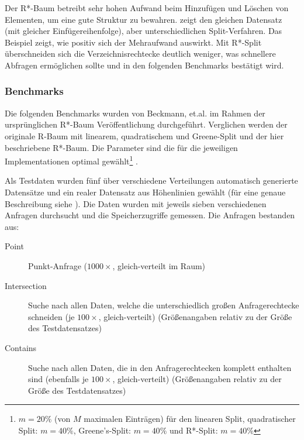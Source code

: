 \documentclass[runningheads,a4paper]{llncs}
\begin{document}
	Der R*-Baum betreibt sehr hohen Aufwand beim Hinzufügen und Löschen von Elementen, um eine gute Struktur zu bewahren.  zeigt den gleichen Datensatz (mit gleicher Einfügereihenfolge), aber unterschiedlichen Split-Verfahren. Das Beispiel zeigt, wie positiv sich der Mehraufwand auswirkt. Mit R*-Split überschneiden sich die Verzeichnisrechtecke deutlich weniger, was schnellere Abfragen ermöglichen sollte und in den folgenden Benchmarks bestätigt wird.

	\subsubsection{Benchmarks} %
	\label{ssub:benchmarks}

	Die folgenden Benchmarks wurden von Beckmann, et.al. im Rahmen der ursprünglichen R*-Baum Veröffentlichung durchgeführt. Verglichen werden der originale R-Baum mit linearem, quadratischem und Greene-Split und der hier beschriebene R*-Baum. Die Parameter sind die für die jeweiligen Implementationen optimal gewählt\footnote{$m=20\%$ (von $M$ maximalen Einträgen) für den linearen Split, quadratischer Split: $m=40\%$, Greene's-Split: $m=40\%$ und R*-Split: $m=40\%$} \citep[vgl.][328]{Beckmann:1990}.

	Als Testdaten wurden fünf über verschiedene Verteilungen automatisch generierte Datensätze und ein realer Datensatz aus Höhenlinien gewählt (für eine genaue Beschreibung siehe \cite[328]{Beckmann:1990}). Die Daten wurden mit jeweils sieben verschiedenen Anfragen durchsucht und die Speicherzugriffe gemessen. Die Anfragen bestanden aus:
	\begin{description}
		\item[Point] Punkt-Anfrage ($1000\times$, gleich-verteilt im Raum)
		\item[Intersection] Suche nach allen Daten, welche die unterschiedlich großen Anfragerechtecke schneiden (je $100\times$, gleich-verteilt) (Größenangaben relativ zu der Größe des Testdatensatzes)
		\item[Contains] Suche nach allen Daten, die in den Anfragerechtecken komplett enthalten sind (ebenfalls je $100\times$, gleich-verteilt) (Größenangaben relativ zu der Größe des Testdatensatzes)
	\end{description}
\end{document}
